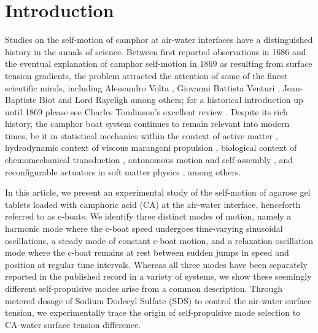 \documentclass[journal=langd5, manuscript=article, layout=twocolumn]{achemso}
\begin{document}
\section{Introduction}
\label{introsec}
Studies on the self-motion of camphor at air-water interfaces have a distinguished history in the annals of science. Between first reported observations in 1686 \cite{Heyde1686} and the eventual explanation of camphor self-motion in 1869 \cite{Mensbrugghe1869} as resulting from surface tension gradients, the problem attracted the attention of some of the finest scientific minds, including Alessandro Volta \cite{Volta1787}, Giovanni Battista Venturi \cite{Venturi1797}, Jean-Baptiste Biot \cite{Biot1801} and Lord Rayeligh \cite{Rayleigh1889} among others; for a historical introduction up until 1869 please see Charles Tomlinson's excellent review \cite{Tomlinson1869}. Despite its rich history, the camphor boat system continues to remain relevant into modern times, be it in statistical mechanics within the context of active matter \cite{Ramaswamy2010}, hydrodynamic context of viscous marangoni propulsion \cite{Lauga2012}, biological context of chemomechanical transduction \cite{Nakata1997}, autonomous motion and self-assembly \cite{Ismagilov2002}, and reconfigurable actuators in soft matter physics \cite{Geryak2014}, among others.

In this article, we present an experimental study of the self-motion of agarose gel tablets loaded with camphoric acid (CA) at the air-water interface, henceforth referred to as c-boats. We identify three distinct modes of motion, namely a harmonic mode where the c-boat speed undergoes time-varying sinusoidal oscillations, a steady mode of constant c-boat motion, and a relaxation oscillation mode where the c-boat remains at rest between sudden jumps in speed and position at regular time intervals. Whereas all three modes have been separately reported in the published record \cite{Hayashima2001, Suematsu2010, Jin2012, velev2012} in a variety of systems, we show these seemingly different self-propulsive modes arise from a common description. Through metered dosage of Sodium Dodecyl Sulfate (SDS) to control the air-water surface tension, we experimentally trace the origin of self-propulsive mode selection to CA-water surface tension difference.
\end{document}
